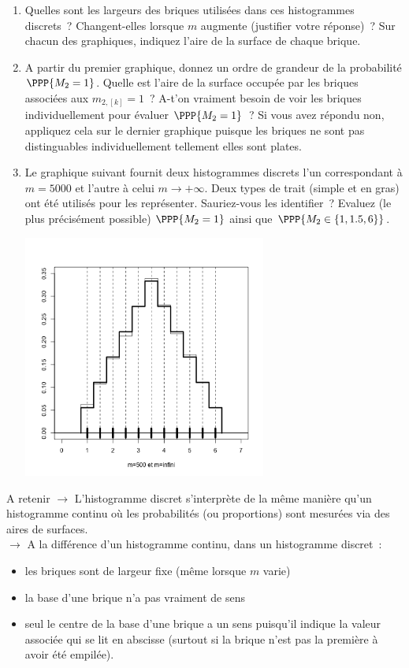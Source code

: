 \documentclass[10pt]{report}
\begin{document}
\begin{exercice}
\begin{enumerate}
\item Quelles sont les largeurs des briques utilisées dans ces histogrammes discrets~? Changent-elles lorsque $m$ augmente (justifier votre réponse)~? Sur chacun des graphiques, indiquez l'aire de la surface de chaque brique. 
\item A partir du premier graphique, donnez un ordre de grandeur de la probabilité $\PPP{M_2=1}$. Quelle est l'aire de la surface occupée par les briques associées aux $m_{2,[k]}=1$~? A-t'on vraiment besoin de voir les briques individuellement pour évaluer $\PPP{M_2=1}$~? Si vous avez répondu non, appliquez cela sur le dernier graphique puisque les briques ne sont pas distinguables individuellement tellement elles sont plates.
\item Le graphique suivant fournit deux histogrammes discrets l'un correspondant à $m=5000$ et l'autre à celui $m\to+\infty$. Deux types de trait (simple et en gras) ont été utilisés pour les représenter. Sauriez-vous les identifier~? Evaluez (le plus précisément possible) $\PPP{M_2=1}$ ainsi que $\PPP{M_2\in\{1,1.5,6\}}$.
      

\centerline{\includegraphics[width=8cm,height=8cm]{img/deuxDesInf}}
\end{enumerate}
\end{exercice}
\begin{Indication}{A retenir}
\noindent $\to$ L'histogramme discret s'interprète de la même manière qu'un histogramme continu où les probabilités (ou proportions) sont mesurées via des aires de surfaces.\\
\noindent $\to$ A la différence d'un histogramme continu, dans un histogramme discret~:
\begin{itemize} 
\item les briques sont de largeur fixe (même lorsque $m$ varie)
\item la base d'une brique n'a pas vraiment de sens
\item seul le centre de la base d'une brique a un sens puisqu'il indique la valeur associée qui se lit en abscisse (surtout si la brique n'est pas la première à avoir été empilée).  
\end{itemize} 
\end{Indication}
\end{document}
